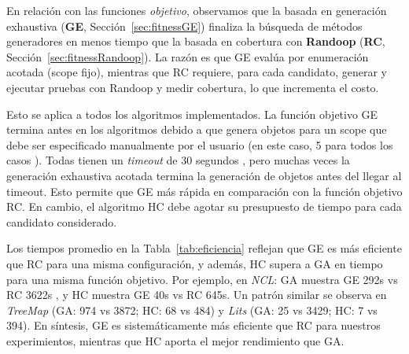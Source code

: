 En relación con las funciones \emph{objetivo}, observamos que la basada en
generación exhaustiva (\textbf{GE}, Sección~\ref{sec:fitnessGE})
finaliza la búsqueda de métodos generadores en menos tiempo que la
basada en cobertura con \textbf{Randoop} (\textbf{RC}, Sección~\ref{sec:fitnessRandoop}).
La razón es que GE evalúa por enumeración acotada (scope fijo), mientras
que RC requiere, para cada candidato, generar y ejecutar pruebas con Randoop y
medir cobertura, lo que incrementa el costo.

%

Esto se aplica a todos los algoritmos implementados. La función 
objetivo GE termina antes en los algoritmos debido a que genera objetos 
para un scope que debe ser especificado manualmente por el usuario (en este caso, 5 para todos 
los casos ). Todas tienen un \emph{timeout} de 
30 segundos , pero muchas veces
la generación exhaustiva acotada termina la generación de objetos antes del llegar al timeout. Esto permite
que GE más rápida  en comparación 
con la función objetivo RC. En cambio, el algoritmo HC debe agotar su presupuesto de tiempo
para cada candidato considerado.

Los tiempos promedio en la Tabla~\ref{tab:eficiencia} reflejan que GE es más eficiente que RC para una misma configuración, y 
además, HC supera a GA en tiempo para una misma función objetivo. 
Por ejemplo, en \emph{NCL}: GA muestra GE 292s vs RC 3622s , 
y HC muestra GE 40s vs RC 645s. 
Un patrón similar se observa en \emph{TreeMap} (GA: 974 vs 3872; HC: 68 vs 484) 
y \emph{Lits} (GA: 25 vs 3429; HC: 7 vs 394). 
En síntesis, GE es sistemáticamente más eficiente que RC para nuestros experimientos, 
mientras que HC aporta el mejor rendimiento que GA.

